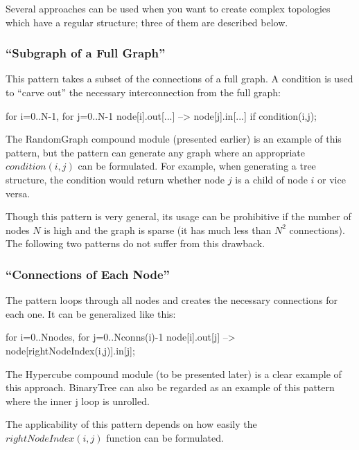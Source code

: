 
Several approaches can be used when you want to create complex
topologies which have a regular structure; three of them are
described below.


\subsubsection{``Subgraph of a Full Graph''}
\label{sec:ned-lang:subgraph-of-full-graph}


This pattern takes a subset of the connections of a full graph.  A
condition is used to ``carve out'' the necessary interconnection from
the full graph:

\begin{ned}
for i=0..N-1, for j=0..N-1 {
    node[i].out[...] --> node[j].in[...] if condition(i,j);
}
\end{ned}

The RandomGraph compound module (presented earlier) is an example of
this pattern, but the pattern can generate any graph where an
appropriate $condition(i,j)$ can be formulated. For example,
when generating a tree structure, the condition
would return whether node $j$ is a child of node $i$ or
vice versa.

Though this pattern is very general, its usage can be prohibitive if
the number of nodes $N$ is high and the graph is sparse (it has
much less than $N^2$ connections). The following
two patterns do not suffer from this drawback.


\subsubsection{``Connections of Each Node''}
\label{sec:ned-lang:connections-of-each-node}

The pattern loops through all nodes and creates the necessary
connections for each one. It can be generalized like this:

\begin{ned}
for i=0..Nnodes, for j=0..Nconns(i)-1 {
    node[i].out[j] --> node[rightNodeIndex(i,j)].in[j];
}
\end{ned}

The Hypercube compound module (to be
presented later) is a clear example of this approach. BinaryTree can
also be regarded as an example of this pattern where the inner j loop
is unrolled.

The applicability of this pattern depends on how easily the $rightNodeIndex(i,j)$
function can be formulated.


